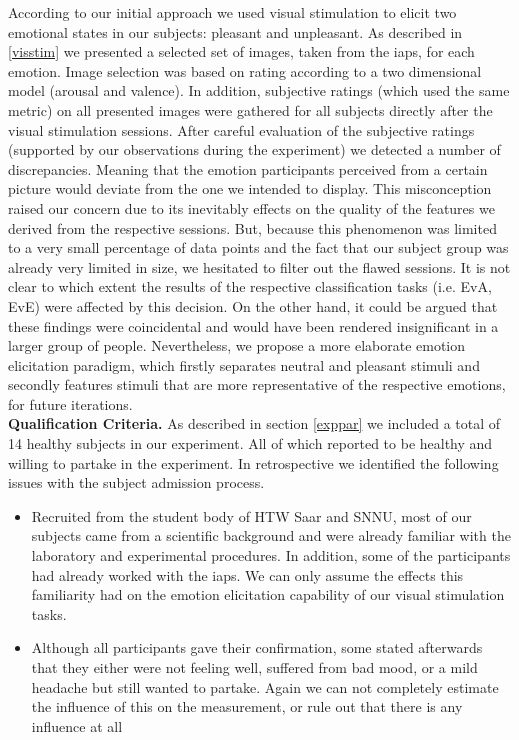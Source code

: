 According to our initial approach we used visual stimulation to elicit two emotional states in our subjects: pleasant and unpleasant. As described in \ref{visstim} we presented a selected set of images, taken from the \gls{iaps}, for each emotion. Image selection was based on rating according to a two dimensional model (arousal and valence). In addition, subjective ratings (which used the same metric) on all presented images were gathered for all subjects directly after the visual stimulation sessions. After careful evaluation of the subjective ratings (supported by our observations during the experiment) we detected a number of discrepancies. Meaning that the emotion participants perceived from a certain picture would deviate from the one we intended to display. This misconception raised our concern due to its inevitably effects on the quality of the features we derived from the respective sessions. But, because this phenomenon was limited to a very small percentage of data points and the fact that our subject group was already very limited in size, we hesitated to filter out the flawed sessions. It is not clear to which extent the results of the respective classification tasks (i.e. EvA, EvE) were affected by this decision. On the other hand, it could be argued that these findings were coincidental and would have been rendered insignificant in a larger group of people. Nevertheless, we propose a more elaborate emotion elicitation paradigm, which firstly separates neutral and pleasant stimuli and secondly features stimuli that are more representative of the respective emotions, for future iterations.\\[10pt]
\textbf{Qualification Criteria.}
As described in section \ref{exppar} we included a total of 14 healthy subjects in our experiment. All of which reported to be healthy and willing to partake in the experiment. In retrospective we identified the following issues with the subject admission process.
\begin{itemize}
\item Recruited from the student body of HTW Saar and SNNU, most of our subjects came from a scientific background and were already familiar with the laboratory and experimental procedures. In addition, some of the participants had already worked with the \gls{iaps}. We can only assume the effects this familiarity had on the emotion elicitation capability of our visual stimulation tasks.
\item Although all participants gave their confirmation, some stated afterwards that they either were not feeling well, suffered from bad mood, or a mild headache but still wanted to partake. Again we can not completely estimate the influence of this on the measurement, or rule out that there is any influence at all
\end{itemize}
